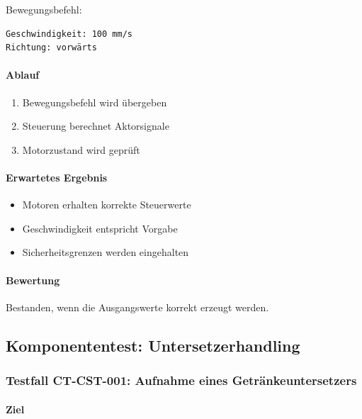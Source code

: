 Bewegungsbefehl:

\begin{verbatim}
Geschwindigkeit: 100 mm/s
Richtung: vorwärts
\end{verbatim}

\paragraph{Ablauf}\label{ablauf-4}

\begin{enumerate}
\def\labelenumi{\arabic{enumi}.}
\tightlist
\item
  Bewegungsbefehl wird übergeben
\item
  Steuerung berechnet Aktorsignale
\item
  Motorzustand wird geprüft
\end{enumerate}

\paragraph{Erwartetes Ergebnis}\label{erwartetes-ergebnis-4}

\begin{itemize}
\tightlist
\item
  Motoren erhalten korrekte Steuerwerte
\item
  Geschwindigkeit entspricht Vorgabe
\item
  Sicherheitsgrenzen werden eingehalten
\end{itemize}

\paragraph{Bewertung}\label{bewertung-4}

Bestanden, wenn die Ausgangswerte korrekt erzeugt werden.

\subsection{Komponententest:
Untersetzerhandling}\label{komponententest-untersetzerhandling}

\subsubsection{Testfall CT-CST-001: Aufnahme eines
Getränkeuntersetzers}\label{testfall-ct-cst-001-aufnahme-eines-getruxe4nkeuntersetzers}

\paragraph{Ziel}\label{ziel-5}

